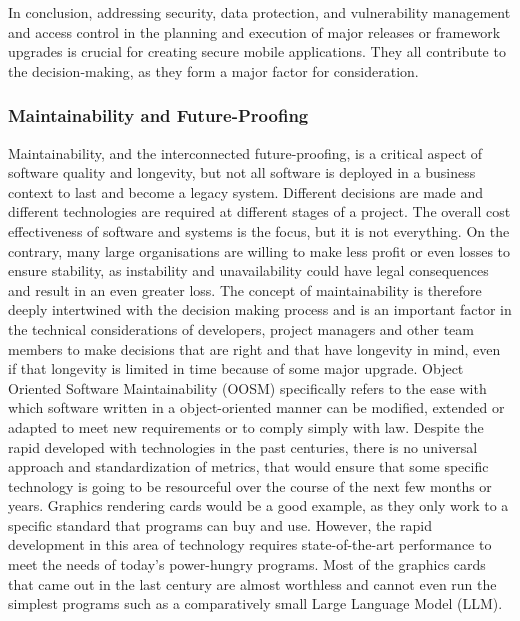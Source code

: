 \noindent In conclusion, addressing security, data protection, and vulnerability management and access control in the planning and execution of major releases or framework upgrades is crucial for creating secure mobile applications. They all contribute to the decision-making, as they form a major factor for consideration. \cite{weippl_introduction_2024}

\subsubsection{Maintainability and Future-Proofing}
Maintainability, and the interconnected future-proofing, is a critical aspect of software quality and longevity, but not all software is deployed in a business context to last and become a legacy system. Different decisions are made and different technologies are required at different stages of a project. The overall cost effectiveness of software and systems is the focus, but it is not everything. On the contrary, many large organisations are willing to make less profit or even losses to ensure stability, as instability and unavailability could have legal consequences and result in an even greater loss. 
The concept of maintainability is therefore deeply intertwined with the decision making process and is an important factor in the technical considerations of developers, project managers and other team members to make decisions that are right and that have longevity in mind, even if that longevity is limited in time because of some major upgrade.
\newline \noindent Object Oriented Software Maintainability (OOSM) specifically refers to the ease with which software written in a object-oriented manner can be modified, extended or adapted to meet new requirements or to comply simply with law. Despite the rapid developed with technologies in the past centuries, there is no universal approach and standardization of metrics, that would ensure that some specific technology is going to be resourceful over the course of the next few months or years. 
\newline \noindent Graphics rendering cards would be a good example, as they only work to a specific standard that programs can buy and use. However, the rapid development in this area of technology requires state-of-the-art performance to meet the needs of today's power-hungry programs. Most of the graphics cards that came out in the last century are almost worthless and cannot even run the simplest programs such as a comparatively small Large Language Model (LLM).
